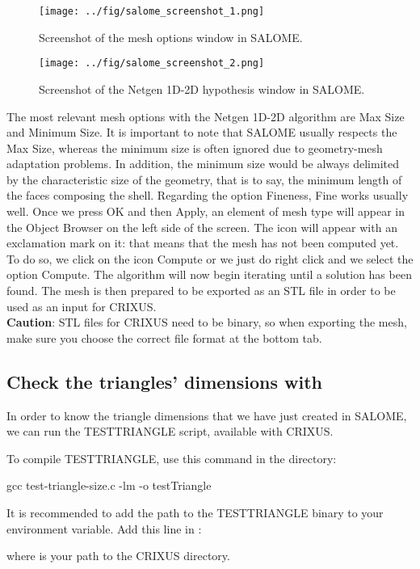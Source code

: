 \documentclass{../GPUSPHtemplate}
\begin{document}
\begin{figure}[h]
  \begin{center}
    \texttt{[image: ../fig/salome\_screenshot\_1.png]}
    \caption{Screenshot of the mesh options window in SALOME.}\label{fig:salome_screenshot_1}   
  \end{center}
\end{figure}

\begin{figure}[h]
  \begin{center}
    \texttt{[image: ../fig/salome\_screenshot\_2.png]}
    \caption{Screenshot of the Netgen 1D-2D hypothesis window in SALOME.}\label{fig:salome_screenshot_2}   
  \end{center}
\end{figure}

The most relevant mesh options with the Netgen 1D-2D algorithm 
are Max Size and Minimum Size. 
It is important to note that SALOME usually respects the Max Size, 
whereas the minimum size is often ignored due to geometry-mesh 
adaptation problems. In addition, the minimum size would be 
always delimited by the characteristic size of the geometry, 
that is to say, the minimum length of the faces composing the shell. 
Regarding the option Fineness, Fine works usually well. 
Once we press OK and then Apply, an element of mesh type 
will appear in the Object Browser on the left side of the screen. 
The icon will appear with an exclamation mark on it: that means 
that the mesh has not been computed yet. To do so, we click on 
the icon Compute or we just do right click and we select 
the option Compute. The algorithm will now begin iterating 
until a solution has been found. 
The mesh is then prepared to be exported as an STL file 
in order to be used as an input for CRIXUS. \\

\textbf{Caution}: STL files for CRIXUS need to be binary, 
so when exporting the mesh, make sure you choose the correct 
file format at the bottom tab.


\subsection{Check the triangles' dimensions with }
In order to know the triangle dimensions that we have just created in SALOME, 
we can run the TESTTRIANGLE script, available with CRIXUS.

To compile TESTTRIANGLE, use this command in the  directory:
\begin{shellcode}
gcc test-triangle-size.c -lm -o testTriangle
\end{shellcode}
It is recommended to add the path to the TESTTRIANGLE binary to your
 environment variable. Add this line in :
where  is your path to the CRIXUS directory.
\end{document}
